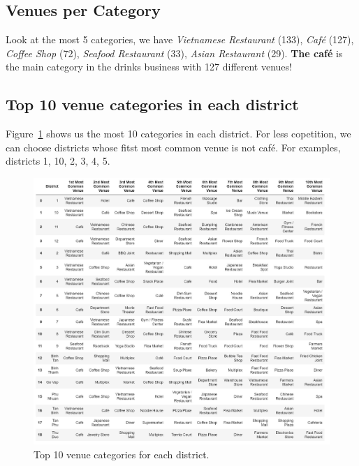 \documentclass[12pt,a4paper]{article}
\begin{document}
\subsection{Venues per Category}

Look at the most 5 categories, we have \textit{Vietnamese Restaurant} (133), \textit{Café} (127), \textit{Coffee Shop} (72), \textit{Seafood Restaurant} (33), \textit{Asian Restaurant} (29). \textbf{The café} is the main category in the drinks business with 127 different venues!

\subsection{Top 10 venue categories in each district}

Figure~\ref{fig:10-most-cat} shows us the most 10 categories in each district. For less copetition, we can choose districts whose fitst most common venue is not café. For examples, districts 1, 10, 2, 3, 4, 5.

\begin{center}
    \begin{figure}[htp]
    \begin{center}
     \includegraphics[width=\textwidth]{fig/df_10}
    \end{center}
    \caption{Top 10 venue categories for each district.}
    \label{fig:10-most-cat}
    \end{figure}
\end{center}
\end{document}
